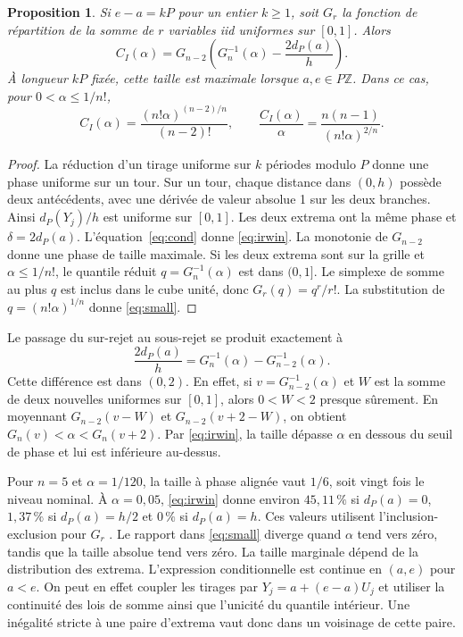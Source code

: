 \documentclass[11pt,a4paper]{article}
\newtheorem{proposition}{Proposition}
\begin{document}
\begin{proposition}\label{prop:general}
Si $e-a=kP$ pour un entier $k\geq1$, soit $G_r$ la fonction de répartition de la somme de $r$ variables iid uniformes sur $[0,1]$. Alors
\begin{equation}\label{eq:irwin}
C_I(\alpha)=G_{n-2}\!\left(G_n^{-1}(\alpha)-\frac{2d_P(a)}{h}\right).
\end{equation}
À longueur $kP$ fixée, cette taille est maximale lorsque $a,e\in P\mathbb Z$. Dans ce cas, pour $0<\alpha\leq1/n!$,
\begin{equation}\label{eq:small}
C_I(\alpha)=\frac{(n!\alpha)^{(n-2)/n}}{(n-2)!},
\qquad
\frac{C_I(\alpha)}{\alpha}=\frac{n(n-1)}{(n!\alpha)^{2/n}}.
\end{equation}
\end{proposition}

\begin{proof}
La réduction d'un tirage uniforme sur $k$ périodes modulo $P$ donne une phase uniforme sur un tour. Sur un tour, chaque distance dans $(0,h)$ possède deux antécédents, avec une dérivée de valeur absolue 1 sur les deux branches. Ainsi $d_P(Y_j)/h$ est uniforme sur $[0,1]$. Les deux extrema ont la même phase et $\delta=2d_P(a)$. L'équation~\eqref{eq:cond} donne \eqref{eq:irwin}. La monotonie de $G_{n-2}$ donne une phase de taille maximale. Si les deux extrema sont sur la grille et $\alpha\leq1/n!$, le quantile réduit $q=G_n^{-1}(\alpha)$ est dans $(0,1]$. Le simplexe de somme au plus $q$ est inclus dans le cube unité, donc $G_r(q)=q^r/r!$. La substitution de $q=(n!\alpha)^{1/n}$ donne \eqref{eq:small}.
\end{proof}

Le passage du sur-rejet au sous-rejet se produit exactement à
\[
\frac{2d_P(a)}{h}=G_n^{-1}(\alpha)-G_{n-2}^{-1}(\alpha).
\]
Cette différence est dans $(0,2)$. En effet, si $v=G_{n-2}^{-1}(\alpha)$ et $W$ est la somme de deux nouvelles uniformes sur $[0,1]$, alors $0<W<2$ presque sûrement. En moyennant $G_{n-2}(v-W)$ et $G_{n-2}(v+2-W)$, on obtient $G_n(v)<\alpha<G_n(v+2)$. Par \eqref{eq:irwin}, la taille dépasse $\alpha$ en dessous du seuil de phase et lui est inférieure au-dessus.

Pour $n=5$ et $\alpha=1/120$, la taille à phase alignée vaut $1/6$, soit vingt fois le niveau nominal. À $\alpha=0{,}05$, \eqref{eq:irwin} donne environ $45{,}11\,\%$ si $d_P(a)=0$, $1{,}37\,\%$ si $d_P(a)=h/2$ et $0\,\%$ si $d_P(a)=h$. Ces valeurs utilisent l'inclusion-exclusion pour $G_r$ \cite{irwinhall}. Le rapport dans \eqref{eq:small} diverge quand $\alpha$ tend vers zéro, tandis que la taille absolue tend vers zéro. La taille marginale dépend de la distribution des extrema. L'expression conditionnelle est continue en $(a,e)$ pour $a<e$. On peut en effet coupler les tirages par $Y_j=a+(e-a)U_j$ et utiliser la continuité des lois de somme ainsi que l'unicité du quantile intérieur. Une inégalité stricte à une paire d'extrema vaut donc dans un voisinage de cette paire.
\end{document}
